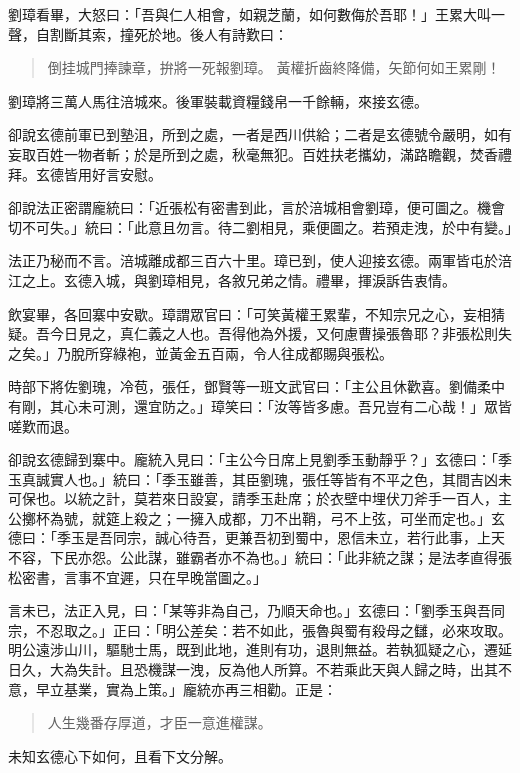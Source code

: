 劉璋看畢，大怒曰：「吾與仁人相會，如親芝蘭，如何數侮於吾耶！」王累大叫一聲，自割斷其索，撞死於地。後人有詩歎曰：

\begin{quote}
倒挂城門捧諫章，拚將一死報劉璋。
黃權折齒終降備，矢節何如王累剛！
\end{quote}

劉璋將三萬人馬往涪城來。後軍裝載資糧錢帛一千餘輛，來接玄德。

卻說玄德前軍已到塾沮，所到之處，一者是西川供給；二者是玄德號令嚴明，如有妄取百姓一物者斬；於是所到之處，秋毫無犯。百姓扶老攜幼，滿路瞻觀，焚香禮拜。玄德皆用好言安慰。

卻說法正密謂龐統曰：「近張松有密書到此，言於涪城相會劉璋，便可圖之。機會切不可失。」統曰：「此意且勿言。待二劉相見，乘便圖之。若預走洩，於中有變。」

法正乃秘而不言。涪城離成都三百六十里。璋已到，使人迎接玄德。兩軍皆屯於涪江之上。玄德入城，與劉璋相見，各敘兄弟之情。禮畢，揮淚訴告衷情。

飲宴畢，各回寨中安歇。璋謂眾官曰：「可笑黃權王累輩，不知宗兄之心，妄相猜疑。吾今日見之，真仁義之人也。吾得他為外援，又何慮曹操張魯耶？非張松則失之矣。」乃脫所穿綠袍，並黃金五百兩，令人往成都賜與張松。

時部下將佐劉瑰，冷苞，張任，鄧賢等一班文武官曰：「主公且休歡喜。劉備柔中有剛，其心未可測，還宜防之。」璋笑曰：「汝等皆多慮。吾兄豈有二心哉！」眾皆嗟歎而退。

卻說玄德歸到寨中。龐統入見曰：「主公今日席上見劉季玉動靜乎？」玄德曰：「季玉真誠實人也。」統曰：「季玉雖善，其臣劉瑰，張任等皆有不平之色，其間吉凶未可保也。以統之計，莫若來日設宴，請季玉赴席；於衣壁中埋伏刀斧手一百人，主公擲杯為號，就筵上殺之；一擁入成都，刀不出鞘，弓不上弦，可坐而定也。」玄德曰：「季玉是吾同宗，誠心待吾，更兼吾初到蜀中，恩信未立，若行此事，上天不容，下民亦怨。公此謀，雖霸者亦不為也。」統曰：「此非統之謀；是法孝直得張松密書，言事不宜遲，只在早晚當圖之。」

言未已，法正入見，曰：「某等非為自己，乃順天命也。」玄德曰：「劉季玉與吾同宗，不忍取之。」正曰：「明公差矣：若不如此，張魯與蜀有殺母之讎，必來攻取。明公遠涉山川，驅馳士馬，既到此地，進則有功，退則無益。若執狐疑之心，遷延日久，大為失計。且恐機謀一洩，反為他人所算。不若乘此天與人歸之時，出其不意，早立基業，實為上策。」龐統亦再三相勸。正是：

\begin{quote}
人生幾番存厚道，才臣一意進權謀。
\end{quote}

未知玄德心下如何，且看下文分解。
